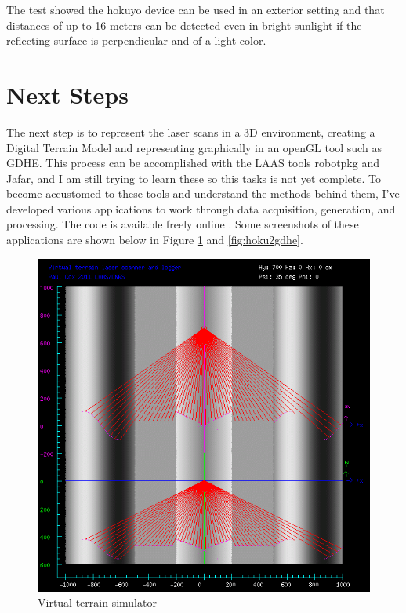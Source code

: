 \documentclass[a4paper,11pt]{report}
\begin{document}
The test showed the hokuyo device can be used in an exterior setting and that distances of up to 16 meters can be detected even in bright sunlight if the reflecting surface is perpendicular and of a light color.

\section{Next Steps}

The next step is to represent the laser scans in a 3D environment, creating a Digital Terrain Model and representing graphically in an openGL tool such as GDHE. This process can be accomplished with the LAAS tools robotpkg and Jafar, and I am still trying to learn these so this tasks is not yet complete. To become accustomed to these tools and understand the methods behind them, I've developed various applications to work through data acquisition, generation, and processing. The code is available freely online \cite{laserhawkgit}. Some screenshots of these applications are shown below in Figure \ref{fig:mkvirt} and \ref{fig:hoku2gdhe}.

\begin{figure}[ht]
 \centering
 \includegraphics[width=12cm]{./Mkvirtsample.png}
 \caption{Virtual terrain simulator}
 \label{fig:mkvirt}
\end{figure}
\end{document}
